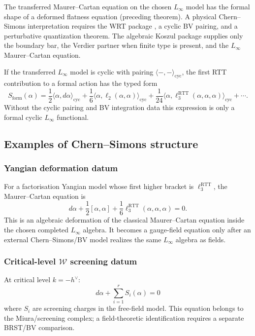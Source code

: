 \begin{remark}[Scope]
The transferred Maurer--Cartan equation on the chosen
$L_\infty$ model has the formal shape of a deformed flatness
equation \textup{(}preceding theorem\textup{)}.  A physical
Chern--Simons interpretation requires the WRT package
\cite{Wit89,RT91}, a cyclic BV pairing, and a perturbative
quantization theorem.  The algebraic Koszul package supplies only
the boundary bar, the Verdier partner when finite type is present,
and the $L_\infty$ Maurer--Cartan equation.
\end{remark}

If the transferred $L_\infty$ model is cyclic with pairing
$\langle-,-\rangle_{\mathrm{cyc}}$, the first RTT contribution to a
formal action has the typed form
\[
S_{\mathrm{form}}(\alpha)
=\frac12\langle\alpha,d\alpha\rangle_{\mathrm{cyc}}
+\frac16\langle\alpha,\ell_2(\alpha,\alpha)\rangle_{\mathrm{cyc}}
+\frac1{24}
\langle\alpha,\ell_3^{\mathrm{RTT}}(\alpha,\alpha,\alpha)
\rangle_{\mathrm{cyc}}+\cdots .
\]
Without the cyclic pairing and BV integration data this expression is
only a formal cyclic $L_\infty$ functional.

\subsection{Examples of Chern--Simons structure}

\subsubsection{Yangian deformation datum}

For a factorisation Yangian model whose first higher bracket is
$\ell_3^{\mathrm{RTT}}$, the Maurer--Cartan equation is
\[
d\alpha + \frac{1}{2}[\alpha, \alpha]
+ \frac{1}{6}\ell_3^{\mathrm{RTT}}(\alpha, \alpha, \alpha) = 0.
\]
This is an algebraic deformation of the classical Maurer--Cartan
equation inside the chosen completed $L_\infty$ algebra.  It becomes
a gauge-field equation only after an external Chern--Simons/BV model
realizes the same $L_\infty$ algebra as fields.

\subsubsection{Critical-level \texorpdfstring{$\mathcal{W}$}{W} screening datum}

At critical level $k = -h^\vee$:
\[
d\alpha + \sum_{i=1}^r S_i(\alpha) = 0
\]
where $S_i$ are screening charges in the free-field model.  This
equation belongs to the Miura/screening complex; a field-theoretic
identification requires a separate BRST/BV comparison.

